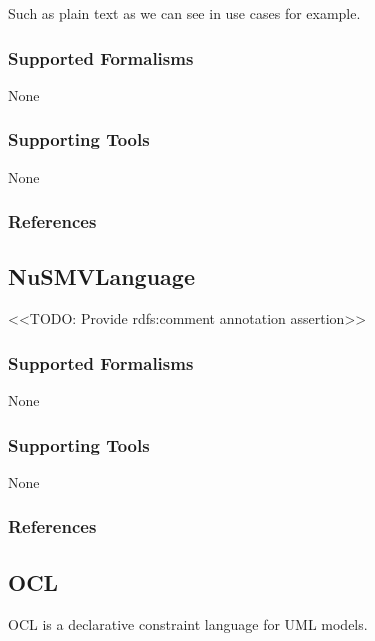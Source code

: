 Such as plain text as we can see in use cases for example.

\subsubsection{Supported Formalisms}

None


\subsubsection{Supporting Tools}

None


\subsubsection{References}





\subsection{NuSMVLanguage}
\label{subsecL:NuSMVLanguage}

<<TODO: Provide rdfs:comment annotation assertion>>

\subsubsection{Supported Formalisms}

None


\subsubsection{Supporting Tools}

None


\subsubsection{References}





\subsection{OCL}
\label{subsecL:OCL}

OCL is a declarative constraint language for UML models.


